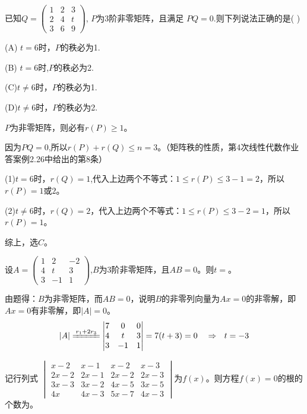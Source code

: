 \documentclass[a4paper]{report}
\begin{document}
\EX

\EX 已知$Q=
\begin{pmatrix}
1&2&3\\
2&4&t\\
3&6&9
\end{pmatrix}
$,
$P$为3阶非零矩阵，且满足
$PQ=0$.则下列说法正确的是( )

(A) $t=6$时，$P$的秩必为1.

(B) $t=6$时,$P$的秩必为2.

(C)$t\neq 6$时，$P$的秩必为1.

(D)$t\neq6$时，$P$的秩必为2.

\begin{jie}
$P$为非零矩阵，则必有$r(P)\geq 1$。

因为$PQ=0$,所以$r(P)+r(Q)\leq n=3$。（矩阵秩的性质，第4次线性代数作业答案例2.26中给出的第8条）

(1)$t=6$时，$r(Q)=1$,代入上边两个不等式：$1\leq r(P)\leq 3-1=2$，所以$r(P)=1$或$2$。

(2)$t\neq 6$时，$r(Q)=2$，代入上边两个不等式：$1\leq r(P)\leq 3-2=1$，所以$r(P)=1$。

综上，选$C$。
\end{jie}

\EX 设$A=
\begin{pmatrix}
1&2&-2\\
4&t&3\\
3&-1&1
\end{pmatrix}
$,$B$为3阶非零矩阵，且$AB=0$。则$t=$\underline{\hphantom{~~~~~~~~}}。

\begin{jie}
由题得：$B$为非零矩阵，而$AB=0$，说明$B$的非零列向量为$Ax=0$的非零解，即$Ax=0$有非零解，即$|A|=0$。
\begin{equation*}
|A|\xlongequal{r_1+2r_3}
\begin{vmatrix}
7&0&0\\
4&t&3\\
3&-1&1
\end{vmatrix}=7(t+3)=0~~~\Rightarrow~~t=-3
\end{equation*}
\end{jie}

\EX


\EX

\EX 记行列式
$
\begin{vmatrix}
x-2&x-1&x-2&x-3\\
2x-2&2x-1&2x-2&2x-3\\
3x-3&3x-2&4x-5&3x-5\\
4x&4x-3&5x-7&4x-3
\end{vmatrix}
$为$f(x)$。则方程$f(x)=0$的根的个数为\underline{\hphantom{~~~~~~~~}}。
\end{document}
